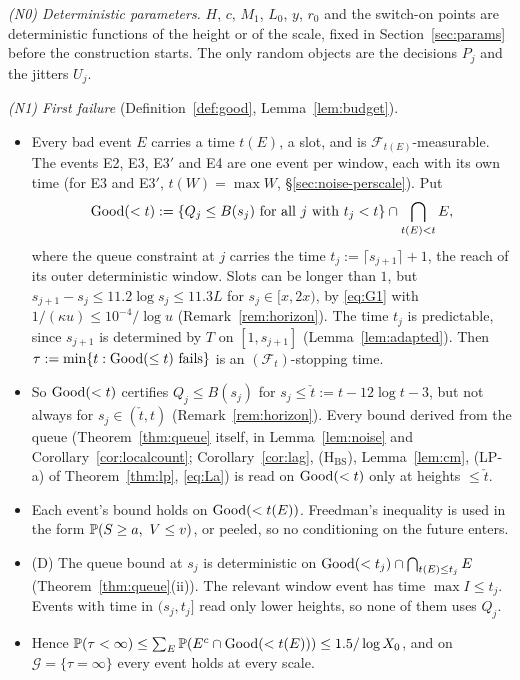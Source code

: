 \emph{(N0) Deterministic parameters.} $H$, $c$, $M_1$, $L_0$, $y$, $r_0$ and the switch-on points are deterministic functions of the
height or of the scale, fixed in Section~\ref{sec:params} before the construction starts. The only random objects are the decisions $P_j$ and the
jitters $U_j$.

\emph{(N1) First failure} (Definition~\ref{def:good}, Lemma~\ref{lem:budget}).
\begin{itemize}
\item Every bad event $E$ carries a time $t(E)$, a slot, and is $\mathcal F_{t(E)}$-measurable. The events E2, E3, E3$'$ and E4 are
one event per window, each with its own time (for E3 and E3$'$, $t(W)=\max W$, \S\ref{sec:noise-perscale}). Put
\[
  \mathrm{Good}(<t):=\{Q_j\le B(s_j)\text{ for all }j\text{ with }t_j<t\}\cap\bigcap_{t(E)<t}E,
\]
where the queue constraint at $j$ carries the time $t_j:=\lceil s_{j+1}\rceil+1$, the reach of its outer deterministic window.
Slots can be longer than $1$, but $s_{j+1}-s_j\le11.2\log s_j\le11.3L$ for $s_j\in[x,2x)$, by \eqref{eq:G1} with
$1/(\kappa u)\le10^{-4}/\log u$ (Remark~\ref{rem:horizon}). The time $t_j$ is predictable, since $s_{j+1}$ is
determined by $T$ on $[1,s_{j+1}]$ (Lemma~\ref{lem:adapted}). Then $\tau:=\min\{t:\mathrm{Good}(\le t)\text{ fails}\}$ is an
$(\mathcal F_t)$-stopping time.
\item So $\mathrm{Good}(<t)$ certifies $Q_j\le B(s_j)$ for $s_j\le\check t:=t-12\log t-3$, but not always for $s_j\in(\check t,t)$
(Remark~\ref{rem:horizon}). Every bound derived from the queue (Theorem~\ref{thm:queue} itself, in Lemma~\ref{lem:noise} and
Corollary~\ref{cor:localcount}; Corollary~\ref{cor:lag}, \textup{(H$_{\mathrm{BS}}$)},
Lemma~\ref{lem:cm}, (LP-a) of Theorem~\ref{thm:lp}, \eqref{eq:La}) is read on $\mathrm{Good}(<t)$ only at heights $\le\check t$.
\item Each event's bound holds on $\mathrm{Good}(<t(E))$. Freedman's inequality is used in the form $\mathbb{P}(S\ge a,\ V\le v)$, or peeled,
so no conditioning on the future enters.
\item (D) The queue bound at $s_j$ is deterministic on $\mathrm{Good}(<t_j)\cap\bigcap_{t(E)\le t_j}E$ (Theorem~\ref{thm:queue}(ii)). The
relevant window event has time $\max I\le t_j$. Events with time in $(s_j,t_j]$ read only lower heights, so none of them uses $Q_j$.
\item Hence $\mathbb{P}(\tau<\infty)\le\sum_E\mathbb{P}(E^c\cap\mathrm{Good}(<t(E)))\le1.5/\log X_0$, and on $\mathcal G=\{\tau=\infty\}$ every event
holds at every scale.
\end{itemize}


